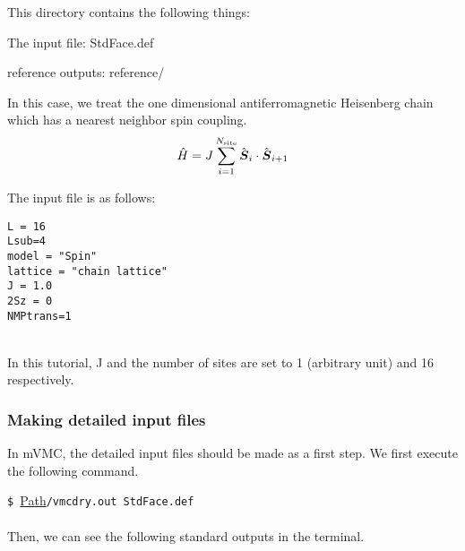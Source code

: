 This directory contains the following things:

The input file: StdFace.def

reference outputs: reference/

In this case, we treat the one dimensional antiferromagnetic Heisenberg chain
which has a nearest neighbor spin coupling.
\begin{align}
  {\hat H} = J \sum_{i=1}^{N_{\rm site}} {\hat {\boldsymbol S}}_i \cdot {\hat {\boldsymbol S}}_{i+1}
\end{align}

The input file is as follows:
\\
\begin{minipage}{10cm}
\begin{screen}
\begin{verbatim}
L = 16
Lsub=4
model = "Spin"
lattice = "chain lattice"
J = 1.0
2Sz = 0
NMPtrans=1
\end{verbatim}
\end{screen}
\end{minipage}
%
\\
In this tutorial, J and the number of sites are set to 1 (arbitrary unit) and 16 respectively.

\subsubsection{Making detailed input files}
In mVMC, the detailed input files should be made as a first step.
We first execute the following command. 

\vspace{1cm}\hspace{-0.7cm}
\verb|$ |\underline{Path}\verb|/vmcdry.out StdFace.def|
\small
\\ \\
Then,  we can see the following standard outputs in the terminal.

